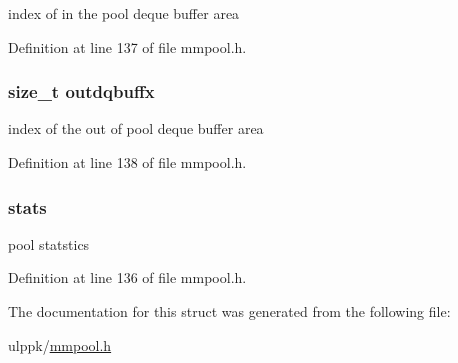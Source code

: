index of in the pool deque buffer area 



Definition at line 137 of file mmpool.\-h.

\hypertarget{struct__bpmf__rec_aca543d61af032d0a2169888529e53c98}{
\subsubsection[{outdqbuffx}]{\setlength{\rightskip}{0pt plus 5cm}size\-\_\-t outdqbuffx}}\label{struct__bpmf__rec_aca543d61af032d0a2169888529e53c98}


index of the out of pool deque buffer area 



Definition at line 138 of file mmpool.\-h.

\hypertarget{struct__bpmf__rec_a7eb91595fe23c00abff0ea998b98335d}{
\subsubsection[{stats}]{ stats}}\label{struct__bpmf__rec_a7eb91595fe23c00abff0ea998b98335d}


pool statstics 



Definition at line 136 of file mmpool.\-h.



The documentation for this struct was generated from the following file\-:\begin{DoxyCompactItemize}
\item 
ulppk/\hyperlink{mmpool_8h}{mmpool.\-h}\end{DoxyCompactItemize}

